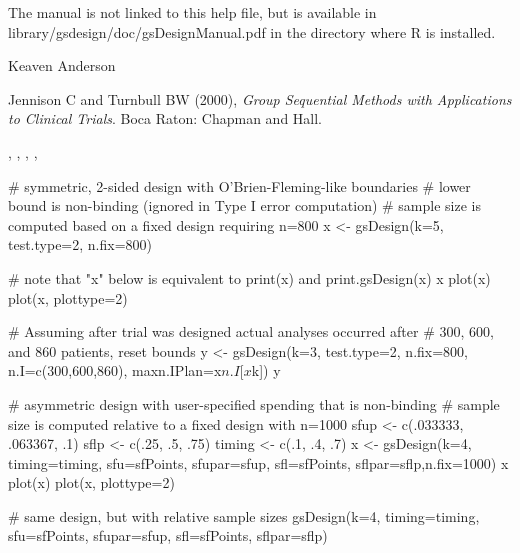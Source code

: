 \begin{Note}\relax
The manual is not linked to this help file, but is available in library/gsdesign/doc/gsDesignManual.pdf
in the directory where R is installed.
\end{Note}
\begin{Author}\relax
Keaven Anderson 
\end{Author}
\begin{References}\relax
Jennison C and Turnbull BW (2000), \emph{Group Sequential Methods with Applications to Clinical Trials}.
Boca Raton: Chapman and Hall.
\end{References}
\begin{SeeAlso}\relax
{}, , , 
, 
\end{SeeAlso}
\begin{Examples}
\begin{ExampleCode}
#  symmetric, 2-sided design with O'Brien-Fleming-like boundaries
#  lower bound is non-binding (ignored in Type I error computation)
#  sample size is computed based on a fixed design requiring n=800
x <- gsDesign(k=5, test.type=2, n.fix=800)

# note that "x" below is equivalent to print(x) and print.gsDesign(x)
x
plot(x)
plot(x, plottype=2)

# Assuming after trial was designed actual analyses occurred after
# 300, 600, and 860 patients, reset bounds 
y <- gsDesign(k=3, test.type=2, n.fix=800, n.I=c(300,600,860),
   maxn.IPlan=x$n.I[x$k])
y

#  asymmetric design with user-specified spending that is non-binding
#  sample size is computed relative to a fixed design with n=1000
sfup <- c(.033333, .063367, .1)
sflp <- c(.25, .5, .75)
timing <- c(.1, .4, .7)
x <- gsDesign(k=4, timing=timing, sfu=sfPoints, sfupar=sfup, sfl=sfPoints,
                    sflpar=sflp,n.fix=1000) 
x
plot(x)
plot(x, plottype=2)

# same design, but with relative sample sizes
gsDesign(k=4, timing=timing, sfu=sfPoints, sfupar=sfup, sfl=sfPoints,
sflpar=sflp)
\end{ExampleCode}
\end{Examples}

